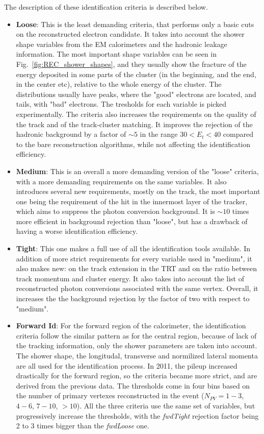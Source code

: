 The description of these identification criteria is described below.
\begin{itemize}
\item {\bfseries Loose}: This is the least demanding criteria, that performs only a basic cuts on the reconstructed electron candidate. It takes into account the shower shape variables from the EM calorimeters and the hadronic leakage information. The most important shape variables can be seen in Fig.~\ref{fig:REC_shower_shapes}, and they usually show the fracture of the energy deposited in some parts of the cluster (in the beginning, and the end, in the center etc), relative to the whole energy of the cluster. The distributions usually have peaks, where the "good" electrons are located, and tails, with "bad" electrons. The tresholds for each variable is picked experimentally. The criteria also increases the requirements on the quality of the track and of the track-cluster matching. It improves the rejection of the hadronic background by a factor of $\sim 5$ in the range $30 < E_{t} < 40$ compared to the bare reconstruction algorithms, while not affecting the identification efficiency.
\item {\bfseries Medium}: This is an overall a more demanding version of the "loose" criteria, with a more demanding requirements on the same variables. It also introduces several new requirements, mostly on the track, the most important one being the requirement of the hit in the innermost layer of the tracker, which aims to suppress the photon conversion background. It is $\sim 10$ times more efficient in background rejection than "loose", but has a drawback of having a worse identification efficiency.
\item {\bfseries Tight}: This one makes a full use of all the identification tools available. In addition of more strict requirements for every variable used in "medium", it also makes new: on the track extension in the TRT and on the ratio between track momentum and cluster energy. It also takes into account the list of reconstructed photon conversions associated with the same vertex. Overall, it increases the the background rejection by the factor of two with respect to "medium".
\item {\bfseries Forward Id}: For the forward region of the calorimeter, the identification criteria follow the similar pattern as for the central region, because of lack of the tracking information, only the shower parameters are taken into account. The shower shape, the longitudal, transverse and normilized lateral momenta are all used for the identification process. In 2011, the pileup increased drastically for the forward region, so the criteria became more strict, and are derived from the previous data. The thresholds come in four bins based on the number of primary vertexes reconstructed in the event ($N_{PV} = 1-3$, $4-6$, $7-10$, $>10$). All the three criteria use the same set of variables, but progressively increase the thresholds, with the {\itshape fwdTight} rejection factor being 2 to 3 times bigger than the {\itshape fwdLoose} one.
\end{itemize}

